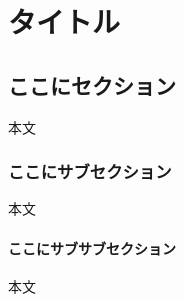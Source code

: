 \documentclass[../main]{subfiles}
\begin{document}
\chapter{タイトル} %
\section{ここにセクション}
本文
\subsection{ここにサブセクション}
本文
\subsubsection{ここにサブサブセクション}
本文
\end{document}
